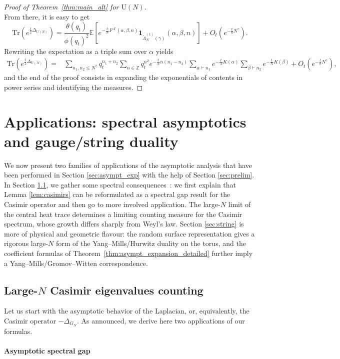 \documentclass[11pt,a4paper,reqno]{article}
\theoremstyle{definition}
\theoremstyle{remark}
\newcommand\U{{\mathrm U}}
\newcommand\Z{{\mathbb Z}}
\newcommand\Tr{\mathrm{Tr}}
\newcommand\E{\mathbb{E}}
\begin{document}
\begin{proof}[Proof of Theorem~\ref{thm:main_alt} for $\U(N)$]
\[\]
From there,  it is easy to get
\[
\Tr(e^{\frac{t}{2}\Delta_{\U(N)}})= \frac{\theta(q_t)}{\phi(q_t)^2}\E\left[e^{-\frac{t}{N}F^{A'}(\alpha,\beta,n)}\mathbf{1}_{\tilde{\Lambda}_N^{(1)}(\gamma)}(\alpha,\beta,n)\right]+O_t\left(e^{-\frac{t}{8}N^\gamma}\right).
\]
Rewriting the expectation as a triple sum over $\alpha$ yields
\begin{align*}
\Tr(e^{\frac{t}{2}\Delta_{\U(N)}})= & \sum_{n_1,n_2\leq N^\gamma}q_t^{n_1+n_2}\sum_{n\in\Z}q_t^{n^2}e^{-\frac{t}{N}n(n_1-n_2)} \sum_{\alpha\vdash n_1}e^{-\frac{t}{N}K(\alpha)}\sum_{\beta\vdash n_2}e^{-\frac{t}{N}K(\beta)}+O_t(e^{-\frac{t}{8}N^\gamma}),
\end{align*}
and the end of the proof consists in expanding the exponentials of contents in power series and identifying the measures.
\end{proof}

\section{Applications: spectral asymptotics and gauge/string duality}

We now present two families of applications of the asymptotic analysis that have been performed in Section \ref{sec:asympt_exp} with the help of Section \ref{sec:prelim}.
In Section \ref{sec:Cardy}, we gather some spectral consequences~: we first explain that Lemma \ref{lem:casimirs} can be reformulated as a spectral gap result for the Casimir operator and then go to  more involved application. The large-$N$ limit of the central heat trace determines a limiting counting measure for the Casimir spectrum, whose growth differs sharply from Weyl's law. Section \ref{sec:string} is more of physical and geometric flavour: the random surface representation gives a rigorous large-$N$ form of the Yang--Mills/Hurwitz duality on the torus, and the coefficient formulas of Theorem~\ref{thm:asympt_expansion_detailed} further imply a Yang--Mills/Gromov--Witten correspondence.

\subsection{Large-$N$ Casimir eigenvalues counting}\label{sec:Cardy}

Let us start with the asymptotic behavior of the Laplacian, or, equivalently, the Casimir operator $-\Delta_{G_N}$. As announced, we derive here two applications of our formulas.

\paragraph{Asymptotic spectral gap}
\end{document}
